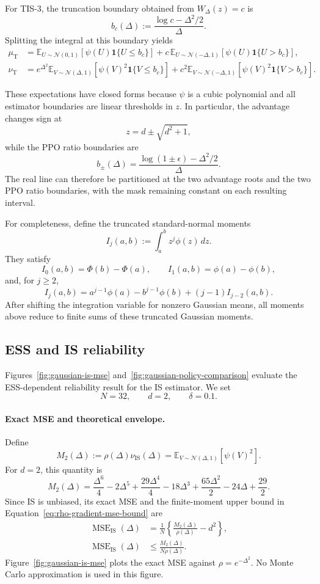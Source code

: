 \documentclass[11pt]{article}
\theoremstyle{remark}
\newcommand{\E}{\mathbb{E}}
\begin{document}
For TIS-3, the truncation boundary obtained from $W_\Delta(z)=c$ is
\[
b_c(\Delta):=\frac{\log c-\Delta^2/2}{\Delta}.
\]
Splitting the integral at this boundary yields
\begin{align*}
\mu_{\mathrm{T}}
&=
\E_{U\sim\mathcal N(0,1)}[\psi(U)\mathbf 1\{U\le b_c\}]
+
c\,\E_{U\sim\mathcal N(-\Delta,1)}[\psi(U)\mathbf 1\{U>b_c\}],\\
\nu_{\mathrm{T}}
&=
e^{\Delta^2}\E_{V\sim\mathcal N(\Delta,1)}[\psi(V)^2\mathbf 1\{V\le b_c\}]
+
c^2\E_{V\sim\mathcal N(-\Delta,1)}[\psi(V)^2\mathbf 1\{V>b_c\}].
\end{align*}

These expectations have closed forms because $\psi$ is a cubic polynomial and all estimator boundaries are linear thresholds in $z$. In particular, the advantage changes sign at
\[
z=d\pm\sqrt{d^2+1},
\]
while the PPO ratio boundaries are
\[
b_\pm(\Delta)
=
\frac{\log(1\pm\epsilon)-\Delta^2/2}{\Delta}.
\]
The real line can therefore be partitioned at the two advantage roots and the two PPO ratio boundaries, with the mask remaining constant on each resulting interval.

For completeness, define the truncated standard-normal moments
\[
I_j(a,b):=\int_a^b z^j\phi(z)\,dz.
\]
They satisfy
\[
I_0(a,b)=\Phi(b)-\Phi(a),
\qquad
I_1(a,b)=\phi(a)-\phi(b),
\]
and, for $j\ge2$,
\[
I_j(a,b)
=
a^{j-1}\phi(a)-b^{j-1}\phi(b)+(j-1)I_{j-2}(a,b).
\]
After shifting the integration variable for nonzero Gaussian means, all moments above reduce to finite sums of these truncated Gaussian moments.

\subsection{ESS and IS reliability}

Figures~\ref{fig:gaussian-is-mse} and~\ref{fig:gaussian-policy-comparison} evaluate the ESS-dependent reliability result for the IS estimator. We set
\[
N=32,
\qquad
d=2,
\qquad
\delta=0.1.
\]

\paragraph{Exact MSE and theoretical envelope.}
Define
\[
M_2(\Delta)
:=
\rho(\Delta)\nu_{\mathrm{IS}}(\Delta)
=
\E_{V\sim\mathcal N(\Delta,1)}[\psi(V)^2].
\]
For $d=2$, this quantity is
\[
M_2(\Delta)
=
\frac{\Delta^6}{4}
-2\Delta^5
+\frac{29\Delta^4}{4}
-18\Delta^3
+\frac{65\Delta^2}{2}
-24\Delta
+\frac{29}{2}.
\]
Since IS is unbiased, its exact MSE and the finite-moment upper bound in Equation~\eqref{eq:rho-gradient-mse-bound} are
\begin{align*}
\operatorname{MSE}_{\mathrm{IS}}(\Delta)
&=
\frac1N\left\{\frac{M_2(\Delta)}{\rho(\Delta)}-d^2\right\},\\
\operatorname{MSE}_{\mathrm{IS}}(\Delta)
&\le
\frac{M_2(\Delta)}{N\rho(\Delta)}.
\end{align*}
Figure~\ref{fig:gaussian-is-mse} plots the exact MSE against $\rho=e^{-\Delta^2}$. No Monte Carlo approximation is used in this figure.
\end{document}
